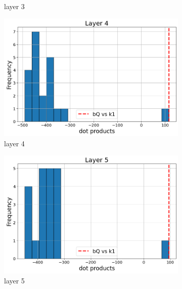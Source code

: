 \documentclass[11pt]{article}
\begin{document}
\begin{figure}[t]
\begin{subfigure}[t]{0.24\textwidth}
    \caption{layer 3}
  \end{subfigure}\hfill
    \vspace{2mm}

  \begin{subfigure}[t]{0.24\textwidth}
    \centering
    \includegraphics[width=1.4\columnwidth]{figures/obs1_appendix/obs1_layer4.png}
    \caption{layer 4}
  \end{subfigure}\hfill
  \begin{subfigure}[t]{0.24\textwidth}
    \centering
    \includegraphics[width=1.4\columnwidth]{figures/obs1_appendix/obs1_layer5.png}
    \caption{layer 5}
  \end{subfigure}\hfill
  \begin{subfigure}[t]{0.24\textwidth}
    \centering

\end{subfigure}
\end{figure}
\end{document}
